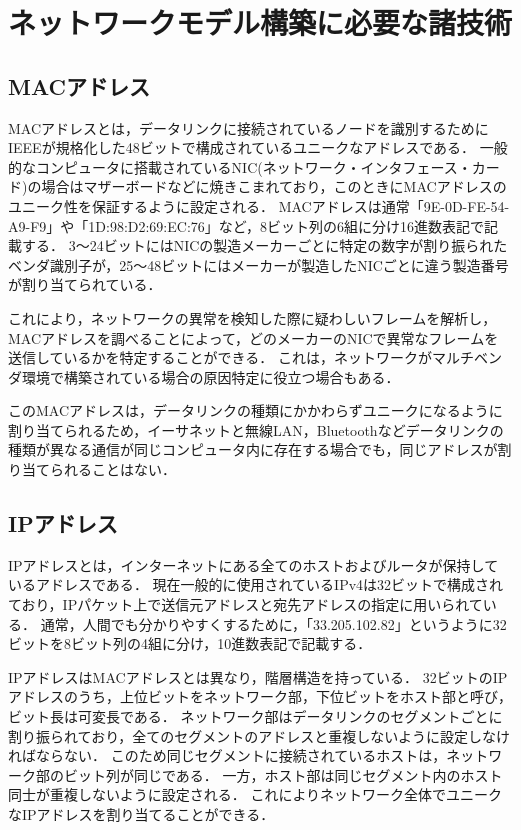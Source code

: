 \section{ネットワークモデル構築に必要な諸技術}

\subsection{MACアドレス}

MACアドレスとは，データリンクに接続されているノードを識別するためにIEEEが規格化した48ビットで構成されているユニークなアドレスである\cite{masteringtcpip}．
一般的なコンピュータに搭載されているNIC(ネットワーク・インタフェース・カード)の場合はマザーボードなどに焼きこまれており，このときにMACアドレスのユニーク性を保証するように設定される．
MACアドレスは通常「9E-0D-FE-54-A9-F9」や「1D:98:D2:69:EC:76」など，8ビット列の6組に分け16進数表記で記載する．
3～24ビットにはNICの製造メーカーごとに特定の数字が割り振られたベンダ識別子が，25～48ビットにはメーカーが製造したNICごとに違う製造番号が割り当てられている．

これにより，ネットワークの異常を検知した際に疑わしいフレームを解析し，MACアドレスを調べることによって，どのメーカーのNICで異常なフレームを送信しているかを特定することができる．
これは，ネットワークがマルチベンダ環境で構築されている場合の原因特定に役立つ場合もある．

このMACアドレスは，データリンクの種類にかかわらずユニークになるように割り当てられるため，イーサネットと無線LAN，Bluetoothなどデータリンクの種類が異なる通信が同じコンピュータ内に存在する場合でも，同じアドレスが割り当てられることはない．

\subsection{IPアドレス}

IPアドレスとは，インターネットにある全てのホストおよびルータが保持しているアドレスである\cite{tanenbaum}．
現在一般的に使用されているIPv4は32ビットで構成されており，IPパケット上で送信元アドレスと宛先アドレスの指定に用いられている．
通常，人間でも分かりやすくするために，「33.205.102.82」というように32ビットを8ビット列の4組に分け，10進数表記で記載する．

IPアドレスはMACアドレスとは異なり，階層構造を持っている\cite{masteringtcpip}．
32ビットのIPアドレスのうち，上位ビットをネットワーク部，下位ビットをホスト部と呼び，ビット長は可変長である．
ネットワーク部はデータリンクのセグメントごとに割り振られており，全てのセグメントのアドレスと重複しないように設定しなければならない．
このため同じセグメントに接続されているホストは，ネットワーク部のビット列が同じである．
一方，ホスト部は同じセグメント内のホスト同士が重複しないように設定される．
これによりネットワーク全体でユニークなIPアドレスを割り当てることができる．

